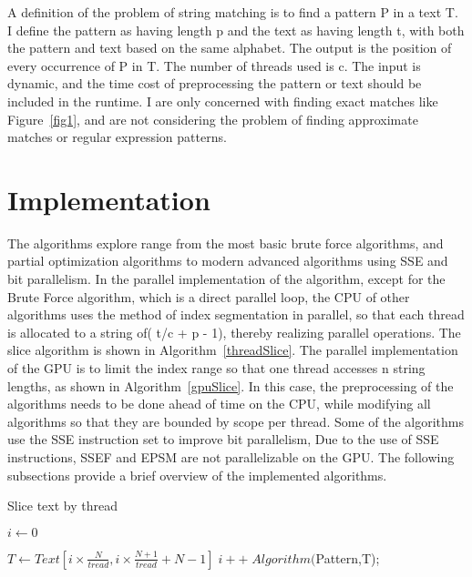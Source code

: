 \documentclass[11pt]{article}       %
\begin{document}
A definition of the problem of string matching is to find a pattern P in a text T.  I define the pattern as having length p and the text as having length t, with both the pattern and text based on the same alphabet. The output is the position of every occurrence of P in T. The number of threads used is c. The input is dynamic, and the time cost of preprocessing the pattern or text should be included in the runtime. I are only concerned with finding exact matches like Figure~\ref{fig1}, and are not considering the problem of finding approximate matches or regular expression patterns.





\section{Implementation} \label{proposedSolution}

The algorithms explore range from the most basic brute force algorithms, and partial optimization algorithms to modern advanced algorithms using SSE and bit parallelism. In the parallel implementation of the algorithm, except for the Brute Force algorithm, which is a direct parallel loop, the CPU of other algorithms uses the method of index segmentation in parallel, so that each thread is allocated to a string of( t/c + p - 1), thereby realizing parallel operations. The slice algorithm is shown in Algorithm~\ref{threadSlice}. The parallel implementation of the GPU is to limit the index range so that one thread accesses n string lengths, as shown in Algorithm~\ref{gpuSlice}. In this case, the preprocessing of the algorithms needs to be done ahead of time on the CPU, while modifying all algorithms so that they are bounded by scope per thread. Some of the algorithms use the SSE instruction set to improve bit parallelism, Due to the use of SSE instructions, SSEF and EPSM are not parallelizable on the GPU. The following subsections provide a brief overview of the implemented algorithms.




\begin{algorithm}[hbt!]
\caption{Slice text by thread}\label{threadSlice}
$i \gets 0$\;
   { 
  $T \gets Text[i \times \frac{N}{tread}, i \times \frac{N+1}{tread} + N - 1]\;
  
  i++\;
  Algorithm($Pattern,T);
  
 }
\end{algorithm}
\end{document}
